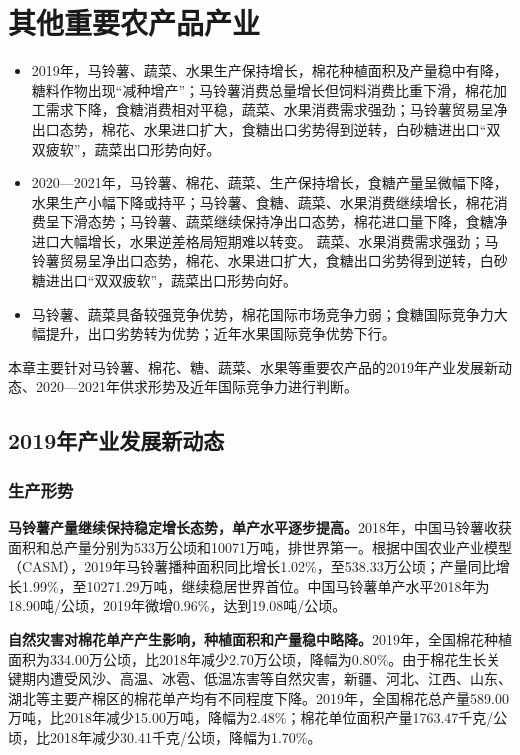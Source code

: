 \documentclass{progbookcn}
\begin{document}
\chapter{其他重要农产品产业}
\begin{titledbox}{}
\begin{itemize}
  \item 2019年，马铃薯、蔬菜、水果生产保持增长，棉花种植面积及产量稳中有降，糖料作物出现“减种增产”；马铃薯消费总量增长但饲料消费比重下滑，棉花加工需求下降，食糖消费相对平稳，蔬菜、水果消费需求强劲；马铃薯贸易呈净出口态势，棉花、水果进口扩大，食糖出口劣势得到逆转，白砂糖进出口“双双疲软”，蔬菜出口形势向好。
  \item 2020—2021年，马铃薯、棉花、蔬菜、生产保持增长，食糖产量呈微幅下降，水果生产小幅下降或持平；马铃薯、食糖、蔬菜、水果消费继续增长，棉花消费呈下滑态势；马铃薯、蔬菜继续保持净出口态势，棉花进口量下降，食糖净进口大幅增长，水果逆差格局短期难以转变。
蔬菜、水果消费需求强劲；马铃薯贸易呈净出口态势，棉花、水果进口扩大，食糖出口劣势得到逆转，白砂糖进出口“双双疲软”，蔬菜出口形势向好。
  \item 马铃薯、蔬菜具备较强竞争优势，棉花国际市场竞争力弱；食糖国际竞争力大幅提升，出口劣势转为优势；近年水果国际竞争优势下行。
 \end{itemize}
\end{titledbox}
本章主要针对马铃薯、棉花、糖、蔬菜、水果等重要农产品的2019年产业发展新动态、2020—2021年供求形势及近年国际竞争力进行判断。

\section{2019年产业发展新动态}
\subsection{生产形势}
\textbf{马铃薯产量继续保持稳定增长态势，单产水平逐步提高。}2018年，中国马铃薯收获面积和总产量分别为533万公顷和10071万吨，排世界第一。根据中国农业产业模型（CASM），2019年马铃薯播种面积同比增长1.02\%，至538.33万公顷；产量同比增长1.99\%，至10271.29万吨，继续稳居世界首位。中国马铃薯单产水平2018年为18.90吨/公顷，2019年微增0.96\%，达到19.08吨/公顷。

\textbf{自然灾害对棉花单产产生影响，种植面积和产量稳中略降。}2019年，全国棉花种植面积为334.00万公顷，比2018年减少2.70万公顷，降幅为0.80\%。由于棉花生长关键期内遭受风沙、高温、冰雹、低温冻害等自然灾害，新疆、河北、江西、山东、湖北等主要产棉区的棉花单产均有不同程度下降。2019年，全国棉花总产量589.00万吨，比2018年减少15.00万吨，降幅为2.48\%；棉花单位面积产量1763.47千克/公顷，比2018年减少30.41千克/公顷，降幅为1.70\%。
\end{document}
